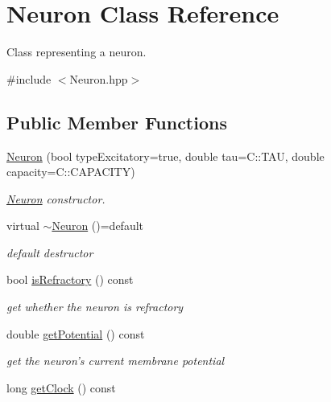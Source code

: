 \hypertarget{classNeuron}{\section{Neuron Class Reference}
\label{classNeuron}
}


Class representing a neuron.  




{\ttfamily \#include $<$Neuron.\-hpp$>$}

\subsection*{Public Member Functions}
\begin{DoxyCompactItemize}
\item 
\hyperlink{classNeuron_ae2a565d7174feaadc1a1a767a5f48632}{Neuron} (bool type\-Excitatory=true, double tau=C\-::\-T\-A\-U, double capacity=C\-::\-C\-A\-P\-A\-C\-I\-T\-Y)
\begin{DoxyCompactList}\small\item\em \hyperlink{classNeuron}{Neuron} constructor. \end{DoxyCompactList}\item 
\hypertarget{classNeuron_a3a5fcd8290aabb7cadb1228e885d3c6c}{virtual \hyperlink{classNeuron_a3a5fcd8290aabb7cadb1228e885d3c6c}{$\sim$\-Neuron} ()=default}\label{classNeuron_a3a5fcd8290aabb7cadb1228e885d3c6c}

\begin{DoxyCompactList}\small\item\em default destructor \end{DoxyCompactList}\item 
\hypertarget{classNeuron_aa40fbb2b025efb1db420da32e16741c1}{bool \hyperlink{classNeuron_aa40fbb2b025efb1db420da32e16741c1}{is\-Refractory} () const }\label{classNeuron_aa40fbb2b025efb1db420da32e16741c1}

\begin{DoxyCompactList}\small\item\em get whether the neuron is refractory \end{DoxyCompactList}\item 
\hypertarget{classNeuron_ae2bc004a58621da0d1c51591400ca87d}{double \hyperlink{classNeuron_ae2bc004a58621da0d1c51591400ca87d}{get\-Potential} () const }\label{classNeuron_ae2bc004a58621da0d1c51591400ca87d}

\begin{DoxyCompactList}\small\item\em get the neuron's current membrane potential \end{DoxyCompactList}\item 
\hypertarget{classNeuron_a0998d7e67725ffc3005d42d95fb45962}{long \hyperlink{classNeuron_a0998d7e67725ffc3005d42d95fb45962}{get\-Clock} () const }\label{classNeuron_a0998d7e67725ffc3005d42d95fb45962}


\end{DoxyCompactItemize}
